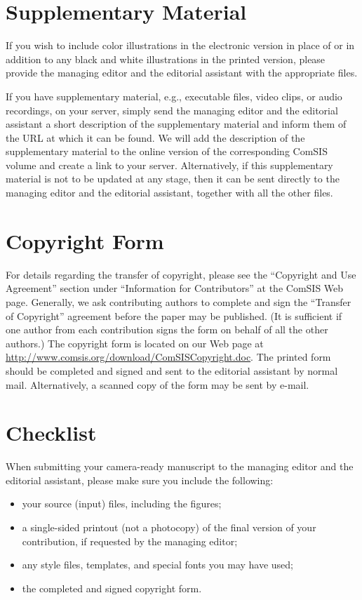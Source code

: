 \documentclass[runningheads]{comsis2}
\begin{document}
\section{Supplementary Material}

If you wish to include color illustrations in the electronic version in place
of or in addition to any black and white illustrations in the printed version,
please provide the managing editor and the editorial assistant with the
appropriate files.

If you have supplementary material, e.g., executable files, video clips, or
audio recordings, on your server, simply send the managing editor and the
editorial assistant a short description of the supplementary material and
inform them of the URL at which it can be found. We will add the description
of the supplementary material to the online version of the corresponding
ComSIS volume and create a link to your server. Alternatively, if this
supplementary material is not to be updated at any stage, then it can be sent
directly to the managing editor and the editorial assistant, together with all
the other files.


\section{Copyright Form}

For details regarding the transfer of copyright, please see the ``Copyright
and Use Agreement'' section under ``Information for Contributors'' at the
ComSIS Web page. Generally, we ask contributing authors to complete and sign
the ``Transfer of Copyright'' agreement before the paper may be published. (It
is sufficient if one author from each contribution signs the form on behalf of
all the other authors.) The copyright form is located on our Web page at
\url{http://www.comsis.org/download/ComSISCopyright.doc}. The printed form should be
completed and signed and sent to the editorial assistant by normal mail.
Alternatively, a scanned copy of the form may be sent by e-mail.


\section{Checklist}

When submitting your camera-ready manuscript to the managing editor and the
editorial assistant, please make sure you include the following:
\begin{itemize}
  \item your source (input) files, including the figures;
  \item a single-sided printout (not a photocopy) of the final version of your contribution, if requested by the managing editor;
  \item any style files, templates, and special fonts you may have used;
  \item the completed and signed copyright form.
\end{itemize}
\end{document}
